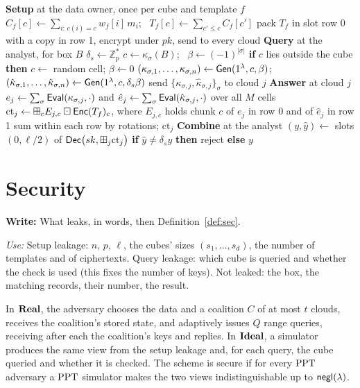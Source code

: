 \documentclass[a4paper,fleqn]{cas-sc}
\newif\ifskeleton \skeletontrue          %
\newcommand{\para}[2]{\ifskeleton\begin{parabox}\textbf{Write:} #1
  \par\smallskip\textit{Use:} #2\end{parabox}\fi}
\begin{document}
\begin{algorithm}[t]
\footnotesize
\caption{Verified range query on a registered cube.}
\label{alg:range}
\begin{algorithmic}[1]
\Statex \textbf{Setup} at the data owner, once per cube and template $f$
\State $C_f[c]\gets\sum_{i:\,c(i)=c}w_f[i]\,m_i$; \ $T_f[c]\gets\sum_{c'\le c}C_f[c']$
\State pack $T_f$ in slot row 0 with a copy in row 1, encrypt under $pk$, send to every cloud
\Statex \textbf{Query} at the analyst, for box $B$
\State $\delta_s\gets\mathbb{Z}_p^{*}$ 
  \State $c\gets\kappa_\sigma(B)$; \ $\beta\gets(-1)^{|\sigma|}$
  \State \textbf{if} $c$ lies outside the cube \textbf{then} $c\gets$ random cell; $\beta\gets0$ 
  \State $(\kappa_{\sigma,1},\dots,\kappa_{\sigma,n})\gets\mathsf{Gen}(1^\lambda,c,\beta)$; \
         $(\hat\kappa_{\sigma,1},\dots,\hat\kappa_{\sigma,n})\gets\mathsf{Gen}(1^\lambda,c,\delta_s\beta)$
\EndFor
\State send $\{\kappa_{\sigma,j},\hat\kappa_{\sigma,j}\}_\sigma$ to cloud $j$
\Statex \textbf{Answer} at cloud $j$
\State $e_j\gets\sum_\sigma\mathsf{Eval}(\kappa_{\sigma,j},\cdot)$ and
       $\hat e_j\gets\sum_\sigma\mathsf{Eval}(\hat\kappa_{\sigma,j},\cdot)$ over all $M$ cells
\State $\mathrm{ct}_j\gets\boxplus_c E_{j,c}\boxdot\mathsf{Enc}(T_f)_c$, where $E_{j,c}$ holds chunk $c$ of $e_j$ in row 0 and of $\hat e_j$ in row 1
\State sum within each row by rotations; \Return $\mathrm{ct}_j$ \Comment{one ciphertext}
\Statex \textbf{Combine} at the analyst
\State $(y,\hat y)\gets$ slots $(0,\ell/2)$ of $\mathsf{Dec}\big(sk,\boxplus_j\mathrm{ct}_j\big)$
\State \textbf{if} $\hat y\neq\delta_s y$ \textbf{then} reject \textbf{else} \Return $y$
\end{algorithmic}
\end{algorithm}

\section{Security}
\label{sec:security}

\para{What leaks, in words, then Definition~\ref{def:sec}.}{Setup leakage: $n$,
$p$, $\ell$, the cubes' sizes $(s_1,\dots,s_d)$, the number of templates and of
ciphertexts. Query leakage: which cube is queried and whether the check is
used (this fixes the number of keys). Not leaked: the box, the matching
records, their number, the result.}

\begin{definition}
\label{def:sec}
In $\mathbf{Real}$, the adversary chooses the data and a coalition $C$ of at most $t$
clouds, receives the coalition's stored state, and adaptively issues $Q$ range
queries, receiving after each the coalition's keys and replies. In $\mathbf{Ideal}$, a
simulator produces the same view from the setup leakage and, for each query,
the cube queried and whether it is checked. The scheme is secure if for every
$\mathrm{PPT}$ adversary a $\mathrm{PPT}$ simulator makes the two views indistinguishable up to
$\mathsf{negl}(\lambda)$.
\end{definition}
\end{document}
